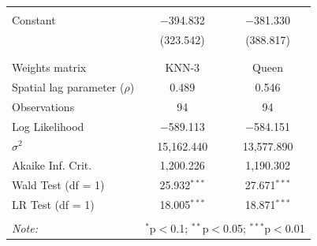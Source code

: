 \begin{table}[!htbp]
\begin{tabular}{@{\extracolsep{5pt}}lcc}
  & & \\ 
 Constant & $-$394.832 & $-$381.330 \\ 
  & (323.542) & (388.817) \\ 
  & & \\ 
\hline \\[-1.8ex] 
Weights matrix & KNN-3 & Queen \\ 
Spatial lag parameter ($\rho$) & 0.489 & 0.546 \\ 
Observations & 94 & 94 \\ 
Log Likelihood & $-$589.113 & $-$584.151 \\ 
$\sigma^{2}$ & 15,162.440 & 13,577.890 \\ 
Akaike Inf. Crit. & 1,200.226 & 1,190.302 \\ 
Wald Test (df = 1) & 25.932$^{***}$ & 27.671$^{***}$ \\ 
LR Test (df = 1) & 18.005$^{***}$ & 18.871$^{***}$ \\ 
\hline 
\hline \\[-1.8ex] 
\textit{Note:}  & \multicolumn{2}{r}{$^{*}$p$<$0.1; $^{**}$p$<$0.05; $^{***}$p$<$0.01} \\ 
\end{tabular} 
\end{table} 
